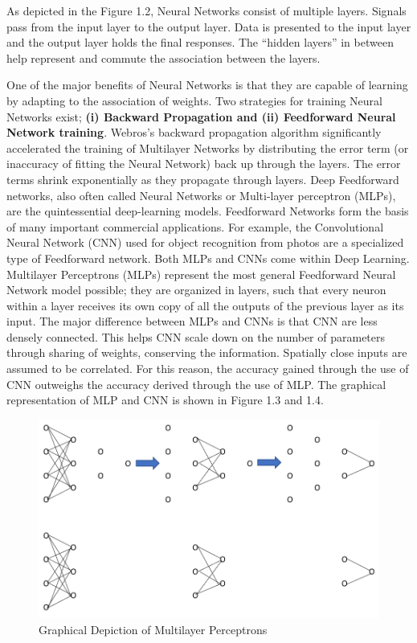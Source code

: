 As depicted in the Figure 1.2, Neural Networks consist of multiple layers. Signals pass from the input layer to the output layer. Data is presented to the input layer and the output layer holds the final responses. The “hidden layers” in between help represent and commute the association between the layers. 

One of the major benefits of Neural Networks is that they are capable of learning by adapting to the association of weights. Two strategies for training Neural Networks exist; \textbf{(i) Backward Propagation and (ii) Feedforward Neural Network training}. Webros’s\cite{werbos1974beyond} backward propagation algorithm significantly accelerated the training of Multilayer Networks by distributing the error term (or inaccuracy of fitting the Neural Network) back up through the layers. The error terms shrink exponentially as they propagate through layers. Deep Feedforward networks, also often called Neural Networks or Multi-layer perceptron (MLPs), are the quintessential deep-learning models. Feedforward Networks form the basis of many important commercial applications. For example, the Convolutional Neural Network (CNN) used for object recognition from photos are a specialized type of Feedforward network\cite{goodfellow2016deep}. Both MLPs and CNNs come within Deep Learning. Multilayer Perceptrons (MLPs) represent the most general Feedforward Neural Network model possible; they are organized in layers, such that every neuron within a layer receives its own copy of all the outputs of the previous layer as its input. The major difference between MLPs and CNNs is that CNN are less densely connected. This helps CNN scale down on the number of parameters through sharing of weights, conserving the information. Spatially close inputs are assumed to be correlated. For this reason, the accuracy gained through the use of CNN outweighs the accuracy derived through the use of MLP. The graphical representation of MLP and CNN is shown in Figure 1.3 and 1.4.

\begin{figure}
	\centering
	\includegraphics[width=0.8\columnwidth]{introduction/fig1c.png}
	\caption{Graphical Depiction of Multilayer Perceptrons}
\end{figure}


